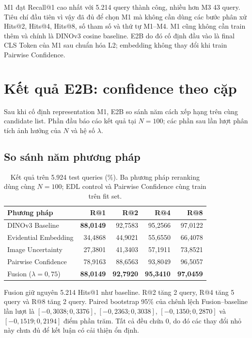 \documentclass[11pt,a4paper]{article}
\begin{document}
M1 đạt Recall@1 cao nhất với 5.214 query thành công, nhiều hơn M3 43 query.
Tiêu chí đầu tiên vì vậy đã đủ để chọn M1 mà không cần dùng các bước phân xử
Hits@2, Hits@4, Hits@8, số tham số và thứ tự M1--M4. M1 cũng không cần train
thêm và chính là DINOv3 cosine baseline. E2B do đó cố định đầu vào là final CLS
Token của M1 sau chuẩn hóa L2; embedding không thay đổi khi train Pairwise
Confidence.

\section{Kết quả E2B: confidence theo cặp}
Sau khi cố định representation M1, E2B so sánh năm cách xếp hạng trên cùng
candidate list. Phần đầu báo cáo kết quả tại $N=100$; các phần sau lần lượt
phân tích ảnh hưởng của $N$ và hệ số $\lambda$.

\subsection{So sánh năm phương pháp}
\begin{table}[H]
\centering
\caption{Kết quả trên 5.924 test queries (\%). Ba phương pháp reranking dùng
cùng $N=100$; EDL control và Pairwise Confidence cùng train trên fit set.}
\begin{tabular}{@{}lrrrr@{}}
\toprule
Phương pháp & R@1 & R@2 & R@4 & R@8\\ \midrule
DINOv3 Baseline & \textbf{88,0149} & 92,7583 & 95,2566 & 97,0122\\
Evidential Embedding & 34,4868 & 44,9021 & 55,6550 & 66,4078\\
Image Uncertainty & 27,3801 & 41,3403 & 57,1911 & 73,8521\\
Pairwise Confidence & 78,9163 & 88,6563 & 93,8049 & 96,5057\\
Fusion ($\lambda=0{,}75$) & \textbf{88,0149} & \textbf{92,7920}
& \textbf{95,3410} & \textbf{97,0459}\\
\bottomrule
\end{tabular}
\end{table}

Fusion giữ nguyên 5.214 Hits@1 như baseline. R@2 tăng 2 query, R@4 tăng 5
query và R@8 tăng 2 query. Paired bootstrap 95\% của chênh lệch Fusion--baseline
lần lượt là $[-0{,}3038;0{,}3376]$, $[-0{,}2363;0{,}3038]$,
$[-0{,}1350;0{,}2870]$ và $[-0{,}1519;0{,}2194]$ điểm phần trăm. Tất cả đều
chứa 0, do đó các thay đổi nhỏ này chưa đủ để kết luận có cải thiện ổn định.
\end{document}
